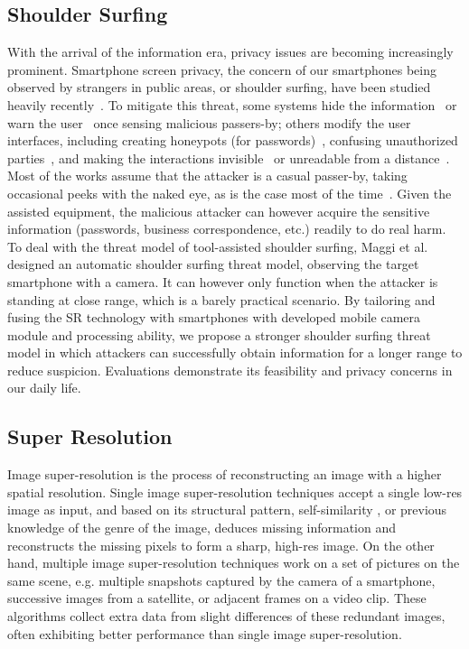 \subsection{Shoulder Surfing}
With the arrival of the information era, privacy issues are becoming increasingly prominent. Smartphone screen privacy, the concern of our smartphones being observed by strangers in public areas, or shoulder surfing, have been studied heavily recently~\cite{eiband2017understanding,goucher2011look,kwon2013covert}. To mitigate this threat, some systems hide the information~\cite{brudy2014anyone} or warn the user~\cite{saad2018communicating} once sensing malicious passers-by; others modify the user interfaces, including creating honeypots (for passwords)~\cite{chakraborty2014tag}, confusing unauthorized parties~\cite{wiedenbeck2006design}, and making the interactions invisible~\cite{kumar2007reducing} or unreadable from a distance~\cite{Chun2019Keep}. Most of the works assume that the attacker is a casual passer-by, taking occasional peeks with the naked eye, as is the case most of the time~\cite{eiband2017understanding}. Given the assisted equipment, the malicious attacker can however acquire the sensitive information (passwords, business correspondence, etc.) readily to do real harm. To deal with the threat model of tool-assisted shoulder surfing,
Maggi et al. designed an automatic shoulder surfing threat model, observing the target smartphone with a camera\cite{maggi2011poster}. It can however only function when the attacker is standing at close range, which is a barely practical scenario. By tailoring and fusing the SR technology with smartphones with developed mobile camera module and processing ability, we propose a stronger shoulder surfing threat model in which attackers can successfully obtain information for a longer range to reduce suspicion. Evaluations demonstrate its feasibility and privacy concerns in our daily life.

\subsection{Super Resolution}
Image super-resolution is the process of reconstructing an image with a higher spatial resolution. Single image super-resolution techniques accept a single low-res image as input, and based on its structural pattern, self-similarity \cite{suetake2008image}, or previous knowledge of the genre of the image, deduces missing information and reconstructs the missing pixels to form a sharp, high-res image. On the other hand, multiple image super-resolution techniques work on a set of pictures on the same scene, e.g. multiple snapshots captured by the camera of a smartphone, successive images from a satellite, or adjacent frames on a video clip. These algorithms collect extra data from slight differences of these redundant images, often exhibiting better performance than single image super-resolution.

